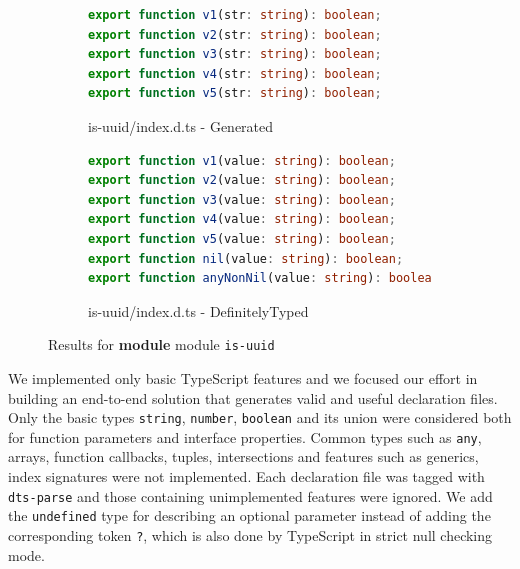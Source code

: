 \documentclass[english,cleveref,autoref,submission]{programming}
\newenvironment{changethis}{%
  \begin{tcolorbox}[breakable,notitle,boxrule=0pt,colback=blue!20,colframe=blue!20]}{%
  \end{tcolorbox}}
\newcommand{\figref}[1]{Figure~\ref{#1}}
\begin{document}


\begin{figure}[tp]
  \centering
  \begin{subfigure}{0.48\linewidth}
    \begin{lstlisting}[language=TypeScript,numbers=none]
export function v1(str: string): boolean;
export function v2(str: string): boolean;
export function v3(str: string): boolean;
export function v4(str: string): boolean;
export function v5(str: string): boolean;
    \end{lstlisting}
    \caption{is-uuid/index.d.ts - Generated}
  \end{subfigure}
  \hfill
  \begin{subfigure}{0.48\linewidth}
    \begin{lstlisting}[language=TypeScript,numbers=none]
export function v1(value: string): boolean;
export function v2(value: string): boolean;
export function v3(value: string): boolean;
export function v4(value: string): boolean;
export function v5(value: string): boolean;
export function nil(value: string): boolean;
export function anyNonNil(value: string): boolean;
    \end{lstlisting}
    \caption{is-uuid/index.d.ts - DefinitelyTyped}
  \end{subfigure}

  \caption{Results for \textbf{module}  module \texttt{is-uuid}}
  \label{fig:experiments-results-module-is-uuid}
\end{figure}

\begin{changethis}
  We implemented only basic TypeScript features and we focused our effort in building an
  end-to-end solution that generates valid and useful declaration files. Only the basic
  types \texttt{string}, \texttt{number}, \texttt{boolean} and its union were considered
  both for function parameters and interface properties. Common types such as
  \texttt{any}, arrays, function callbacks, tuples, intersections and features such as
  generics, index signatures were not implemented. Each declaration file was tagged with
  \texttt{dts-parse} and those containing unimplemented features were ignored. We add the
  \texttt{undefined} type for describing an optional parameter instead of adding the
  corresponding token \texttt{?}, which is also done by TypeScript in strict null checking
  mode\cite{typescript-optional-parameters-and-properties}.
\end{changethis}
\end{document}
